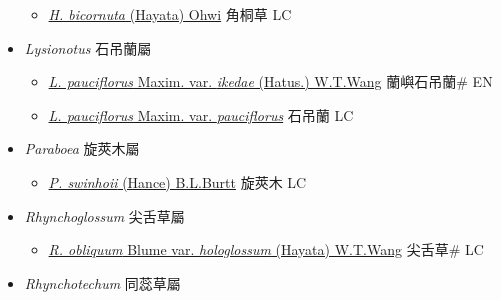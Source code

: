 \begin{itemize}
  \begin{itemize}
        \item[] \href{http://www.theplantlist.org/tpl1.1/search?q=Hemiboea+bicornuta}{\textit{H. bicornuta} (Hayata) Ohwi}   角桐草 LC
  \end{itemize}
 \item[] \textit{Lysionotus} 石吊蘭屬
                    
  \begin{itemize}
        \item[] \href{http://www.theplantlist.org/tpl1.1/search?q=Lysionotus+pauciflorus+var.+ikedae}{\textit{L. pauciflorus} Maxim. var. \textit{ikedae} (Hatus.) W.T.Wang}   蘭嶼石吊蘭\# EN
        \item[] \href{http://www.theplantlist.org/tpl1.1/search?q=Lysionotus+pauciflorus+var.+pauciflorus}{\textit{L. pauciflorus} Maxim. var. \textit{pauciflorus}}   石吊蘭 LC
  \end{itemize}
 \item[] \textit{Paraboea} 旋莢木屬
                    
  \begin{itemize}
        \item[] \href{http://www.theplantlist.org/tpl1.1/search?q=Paraboea+swinhoii}{\textit{P. swinhoii} (Hance) B.L.Burtt}   旋莢木 LC
  \end{itemize}
 \item[] \textit{Rhynchoglossum} 尖舌草屬
                    
  \begin{itemize}
        \item[] \href{http://www.theplantlist.org/tpl1.1/search?q=Rhynchoglossum+obliquum+var.+hologlossum}{\textit{R. obliquum} Blume var. \textit{hologlossum} (Hayata) W.T.Wang}   尖舌草\# LC
  \end{itemize}
 \item[] \textit{Rhynchotechum} 同蕊草屬
                    

\end{itemize}
